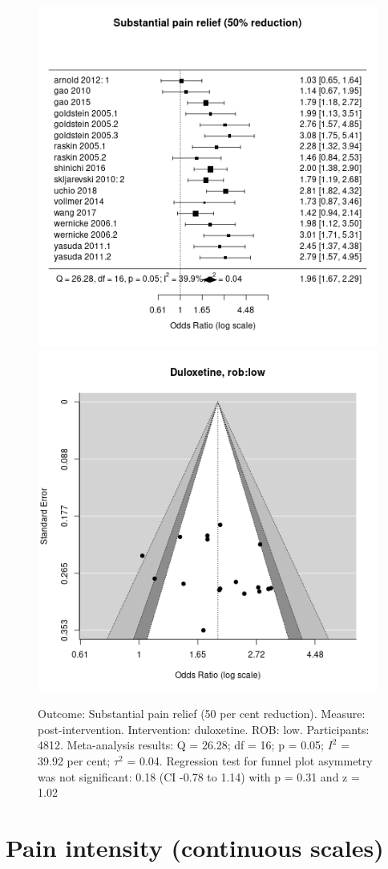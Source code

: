 \documentclass{report}\usepackage[]{graphicx}\usepackage[]{color}
\newenvironment{knitrout}{}{} %
\begin{document}
\begin{figure}

\begin{knitrout}
\color{fgcolor}
\includegraphics[width=0.5\linewidth,height=0.35\textheight]{img/pain_sub-duloxetine-rob-low-forest} 
\includegraphics[width=0.5\linewidth,height=0.35\textheight]{img/pain_sub-duloxetine-rob-low-funnel} 
\end{knitrout}

\caption[Substantial pain: duloxetine, low ROB]{Outcome: Substantial pain relief  (50 per cent reduction). Measure: post-intervention. Intervention: duloxetine. ROB: low. Participants: 4812. Meta-analysis results: Q = 26.28; df = 16; p = 0.05; $I^2$ = 39.92 per cent; $\tau^2$ = 0.04. Regression test for funnel plot asymmetry was not significant: 0.18 (CI -0.78 to 1.14) with p = 0.31 and z = 1.02
}
\label{fig:subpain-lowrob-dulox}
\end{figure}

\newpage

\section{Pain intensity (continuous scales)}
\end{document}
